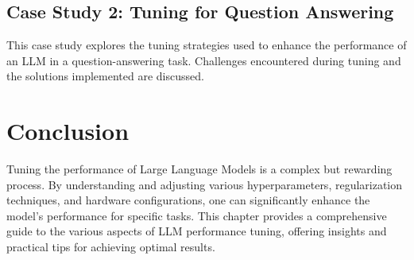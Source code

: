 \subsection{Case Study 2: Tuning for Question Answering}
This case study explores the tuning strategies used to enhance the performance of an LLM in a question-answering task. Challenges encountered during tuning and the solutions implemented are discussed.

\section{Conclusion}
Tuning the performance of Large Language Models is a complex but rewarding process. By understanding and adjusting various hyperparameters, regularization techniques, and hardware configurations, one can significantly enhance the model's performance for specific tasks. This chapter provides a comprehensive guide to the various aspects of LLM performance tuning, offering insights and practical tips for achieving optimal results.




